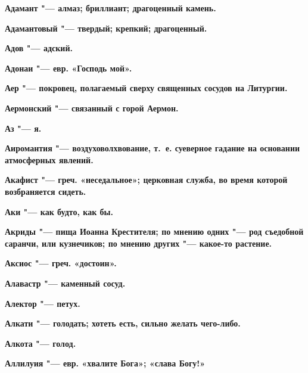 \begin{mymulticols}{2}
\bfseries Адамант\normalfont{} "--- алмаз; бриллиант; драгоценный камень. 




\bfseries Адамантовый\normalfont{} "--- твердый; крепкий; драгоценный. 




\bfseries Адов\normalfont{} "--- адский. 




\bfseries Адонаи\normalfont{} "--- евр. «Господь мой». 




\bfseries Аер\normalfont{} "--- покровец, полагаемый сверху священных сосудов на Литургии. 




\bfseries Аермонский\normalfont{} "--- связанный с горой Аермон. 




\bfseries Аз\normalfont{} "--- я. 




\bfseries Аиромантия\normalfont{} "--- воздуховолхвование, т.~е. суеверное гадание на основании атмосферных явлений. 




\bfseries Акафист\normalfont{} "--- греч. «неседальное»; церковная служба, во время которой возбраняется сидеть. 




\bfseries Аки\normalfont{} "--- как будто, как бы. 




\bfseries Акриды\normalfont{} "--- пища Иоанна Крестителя; по мнению одних "--- род съедобной саранчи, или кузнечиков; по мнению других "--- какое-то растение. 




\bfseries Аксиос\normalfont{} "--- греч. «достоин». 




\bfseries Алавастр\normalfont{} "--- каменный сосуд. 




\bfseries Алектор\normalfont{} "--- петух. 




\bfseries Алкати\normalfont{} "--- голодать; хотеть есть, сильно желать чего-либо. 




\bfseries Алкота\normalfont{} "--- голод. 




\bfseries Аллилуия\normalfont{} "--- евр. «хвалите Бога»; «слава Богу!» 





\end{mymulticols}
